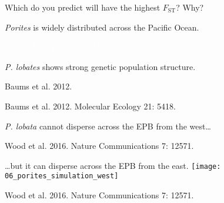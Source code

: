 \documentclass[t]{beamer}
\begin{document}
%

{
\begin{frame}[b]{Which do you predict will have the highest $F_\mathrm{ST}$? Why?}

\end{frame}
}
{
\begin{frame}[b]{\textit{Porites} is widely distributed across the Pacific Ocean.}

\hfill \tiny\textcolor{white}{Baums Lab, Penn State Univ.}
\end{frame}
}
%
%

{
\begin{frame}[b]{\textit{P. lobates} shows strong genetic population structure.}

\tiny Baums et al. 2012.
\end{frame}
}
%
{
\begin{frame}[b]

\hfill \tiny Baums et al. 2012. Molecular Ecology 21: 5418.
\end{frame}
}
%
{
\begin{frame}[b]{\textit{P. lobata} cannot disperse across the EPB from the west\dots}

\tiny Wood et al. 2016. Nature Communications 7: 12571.
\end{frame}
}
%
\begin{frame}[t]{\dots but it can disperse across the EPB from the east.}
\centering
\texttt{[image: 06\_porites\_simulation\_west]}

	\vfilll
\hfill \tiny Wood et al. 2016. Nature Communications 7: 12571.

\end{frame}
\end{document}

